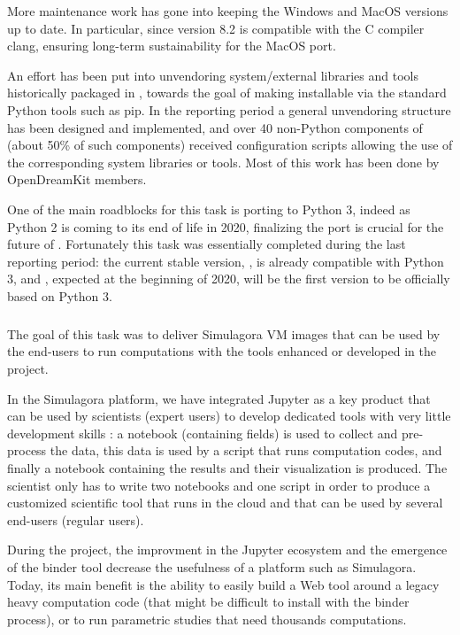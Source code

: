   More maintenance work has gone into keeping the Windows and MacOS
  versions up to date. In particular, since version 8.2 \Sage is
  compatible with the C compiler clang, ensuring long-term
  sustainability for the MacOS port.

  An effort has been put into unvendoring system/external libraries and tools historically
  packaged in \Sage, towards the goal of making \Sage installable via
  the standard Python tools such as pip. In the reporting period a general
  unvendoring structure has been designed and implemented, and over 40
  non-Python components of \Sage (about 50\% of such components)
  received configuration scripts allowing the use of the corresponding
  system libraries or tools. Most of this work has been done by OpenDreamKit
  members.


  One of the main roadblocks for this task is porting \Sage to Python
  3, indeed as Python 2 is coming to its end of life in 2020,
  finalizing the port is crucial for the future of \Sage. Fortunately
  this task was essentially completed during the last reporting
  period: the current stable version, , is already compatible
  with Python 3, and , expected at the beginning of 2020,
  will be the first \Sage version to be officially based on Python 3.

  \subparagraph{}
  \label{component-architecture@simulagora-dev}
  The goal of this task was to deliver Simulagora VM images that can be
  used by the end-users to run computations with the tools enhanced or
  developed in the project.
  
  In the Simulagora platform, we have integrated Jupyter as a key product
  that can be used by scientists (expert users) to develop dedicated tools
  with very little development skills : a notebook (containing fields) is
  used to collect and pre-process the data, this data is used by a script
  that runs computation codes, and finally a notebook containing the results
  and their visualization is produced. The scientist only has to write two
  notebooks and one script in order to produce a customized scientific tool
  that runs in the cloud and that can be used by several end-users (regular
  users).
  
  During the project, the improvment in the Jupyter ecosystem and the emergence
  of the binder tool decrease the usefulness of a platform such as Simulagora.
  Today, its main benefit is the ability to easily build a Web tool around a
  legacy heavy computation code (that might be difficult to install with
  the binder process), or to run parametric studies that need thousands
  computations.
  
